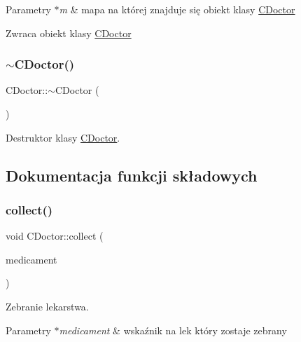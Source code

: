\begin{DoxyParams}{Parametry}
{\em $\ast$m} & mapa na której znajduje się obiekt klasy \mbox{\hyperlink{class_c_doctor}{C\+Doctor}} \\
\hline
\end{DoxyParams}
\begin{DoxyReturn}{Zwraca}
obiekt klasy \mbox{\hyperlink{class_c_doctor}{C\+Doctor}} 
\end{DoxyReturn}
\mbox{\label{class_c_doctor_a028188391f952493500ed191b40cee20}} 
\subsubsection{\texorpdfstring{$\sim$\+C\+Doctor()}{~CDoctor()}}
{\footnotesize\ttfamily C\+Doctor\+::$\sim$\+C\+Doctor (\begin{DoxyParamCaption}{ }\end{DoxyParamCaption})}



Destruktor klasy \mbox{\hyperlink{class_c_doctor}{C\+Doctor}}. 



\subsection{Dokumentacja funkcji składowych}
\mbox{\label{class_c_doctor_a4f1c052261657a38df79427f6d448d1b}} 
\subsubsection{\texorpdfstring{collect()}{collect()}}
{\footnotesize\ttfamily void C\+Doctor\+::collect (\begin{DoxyParamCaption}\item[{\mbox{\hyperlink{class_c_medicament}{C\+Medicament}} $\ast$}]{medicament }\end{DoxyParamCaption})}



Zebranie lekarstwa. 


\begin{DoxyParams}{Parametry}
{\em $\ast$medicament} & wskaźnik na lek który zostaje zebrany \\
\hline
\end{DoxyParams}
\mbox{\label{class_c_doctor_a0f9f393a967e7294e31779cbb8f0f401}} 
